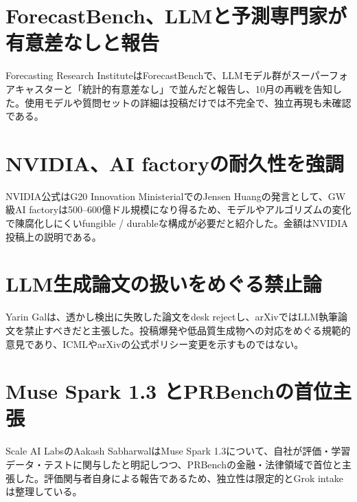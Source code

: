\section{ForecastBench、LLMと予測専門家が有意差なしと報告}
Forecasting Research InstituteはForecastBenchで、LLMモデル群がスーパーフォアキャスターと「統計的有意差なし」で並んだと報告し、10月の再戦を告知した。使用モデルや質問セットの詳細は投稿だけでは不完全で、独立再現も未確認である。

\section{NVIDIA、AI factoryの耐久性を強調}
NVIDIA公式はG20 Innovation MinisterialでのJensen Huangの発言として、GW級AI factoryは500--600億ドル規模になり得るため、モデルやアルゴリズムの変化で陳腐化しにくいfungible / durableな構成が必要だと紹介した。金額はNVIDIA投稿上の説明である。

\section{LLM生成論文の扱いをめぐる禁止論}
Yarin Galは、透かし検出に失敗した論文をdesk rejectし、arXivではLLM執筆論文を禁止すべきだと主張した。投稿爆発や低品質生成物への対応をめぐる規範的意見であり、ICMLやarXivの公式ポリシー変更を示すものではない。

\section{Muse Spark 1.3 とPRBenchの首位主張}
Scale AI LabsのAakash SabharwalはMuse Spark 1.3について、自社が評価・学習データ・テストに関与したと明記しつつ、PRBenchの金融・法律領域で首位と主張した。評価関与者自身による報告であるため、独立性は限定的とGrok intakeは整理している。
